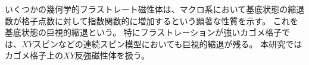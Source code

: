 \documentclass[12pt,titlepage,dvipdfmx]{jarticle}
\begin{document}

いくつかの幾何学的フラストレート磁性体は、マクロ系において基底状態の縮退数が格子点数に対して指数関数的に増加するという顕著な性質を示す。
これを基底状態の巨視的縮退という。
特にフラストレーションが強いカゴメ格子では、$XY$スピンなどの連続スピン模型においても巨視的縮退が残る。
本研究ではカゴメ格子上の$XY$反強磁性体を扱う。
\end{document}
